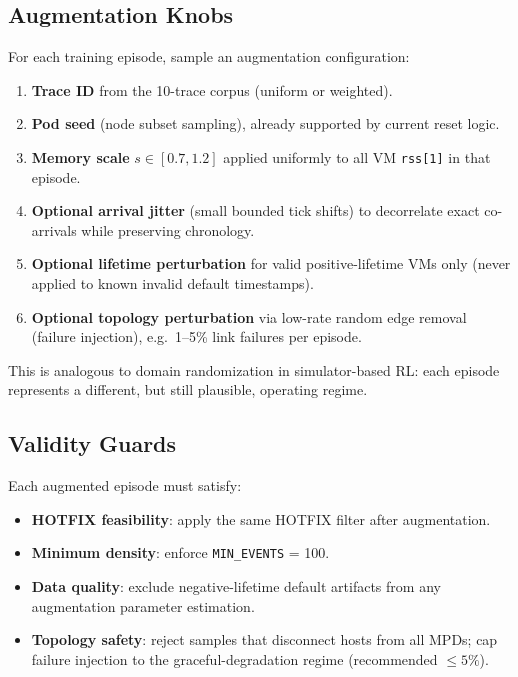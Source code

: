 \documentclass[11pt]{article}
\begin{document}
\subsection{Augmentation Knobs}

For each training episode, sample an augmentation configuration:
\begin{enumerate}
  \item \textbf{Trace ID} from the 10-trace corpus (uniform or weighted).
  \item \textbf{Pod seed} (node subset sampling), already supported by
  current reset logic.
  \item \textbf{Memory scale} $s \in [0.7,1.2]$ applied uniformly to all
  VM \texttt{rss[1]} in that episode.
  \item \textbf{Optional arrival jitter} (small bounded tick shifts) to
  decorrelate exact co-arrivals while preserving chronology.
  \item \textbf{Optional lifetime perturbation} for valid positive-lifetime
  VMs only (never applied to known invalid default timestamps).
  \item \textbf{Optional topology perturbation} via low-rate random edge
  removal (failure injection), e.g.\ 1--5\% link failures per episode.
\end{enumerate}

This is analogous to domain randomization in simulator-based RL: each
episode represents a different, but still plausible, operating regime.

\subsection{Validity Guards}

Each augmented episode must satisfy:
\begin{itemize}
  \item \textbf{HOTFIX feasibility}: apply the same HOTFIX filter after
  augmentation.
  \item \textbf{Minimum density}: enforce \texttt{MIN\_EVENTS} = 100.
  \item \textbf{Data quality}: exclude negative-lifetime default artifacts
  from any augmentation parameter estimation.
  \item \textbf{Topology safety}: reject samples that disconnect hosts from
  all MPDs; cap failure injection to the graceful-degradation regime
  (recommended $\leq 5\%$).
\end{itemize}
\end{document}
